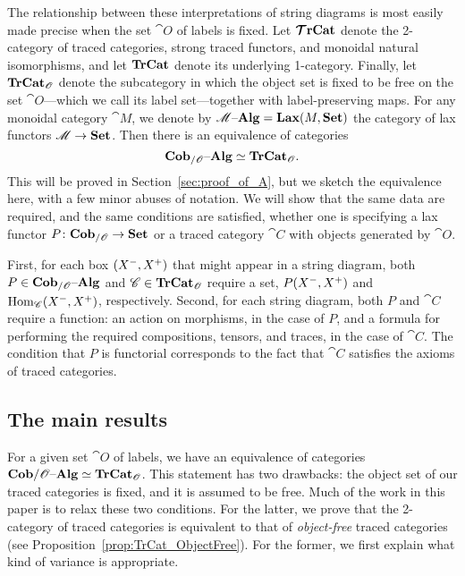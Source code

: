 \documentclass[12pt,oneside,article,draft]{memoir}
\begin{document}
The relationship between these interpretations of string diagrams is most easily made precise when
the set $\cat{O}$ of labels is fixed. Let $\bm{\mathcal{T}}\mathbf{rCat}$ denote the 2-category of traced categories,
strong traced functors, and monoidal natural isomorphisms, and let $\mathbf{TrCat}$ denote its underlying 1-category. Finally, let $\mathbf{TrCat}_{\mathscr{O}}$ denote the subcategory in which the object set is fixed to be free on the set $\cat{O}$---which we
call its label set---together with label-preserving maps. For any monoidal category
$\cat{M}$, we denote by $\mathscr{M}{\text \textendash}\mathbf{Alg}=\mathbf{Lax}(M,\mathbf{Set})$ the category of lax functors $\mathscr{M}\to\mathbf{Set}$. Then there
is an equivalence of categories
\begin{equation}\label{eq:single_fiber}
   \mathbf{Cob}_{/\mathscr{O}}{\text \textendash}\mathbf{Alg}\simeq\mathbf{TrCat}_{\mathscr{O}}.
\end{equation}
This will be proved in Section~\ref{sec:proof_of_A}, but we sketch the equivalence here, with a few
minor abuses of notation. We will show that the same data are required, and the same conditions are
satisfied, whether one is specifying a lax functor $P\colon\mathbf{Cob}_{/\mathscr{O}}\to\mathbf{Set}$ or a traced category
$\cat{C}$ with objects generated by $\cat{O}$.

First, for each box $(X^-,X^+)$ that might appear in a string diagram, both $P\in \mathbf{Cob}_{/\mathscr{O}}{\text \textendash}\mathbf{Alg}$ and
$\mathscr{C}\in\mathbf{TrCat}_{\mathscr{O}}$ require a set, $P(X^-,X^+)$ and $\operatorname{Hom}_{\mathscr{C}}(X^-,X^+)$, respectively.
Second, for each string diagram, both $P$ and $\cat{C}$ require a function: an action on morphisms,
in the case of $P$, and a formula for performing the required compositions, tensors, and traces, in
the case of $\cat{C}$.  The condition that $P$ is functorial corresponds to the fact that $\cat{C}$
satisfies the axioms of traced categories.

\subsection{The main results}\label{subsec:main_results}

For a given set $\cat{O}$ of labels, we have an equivalence of categories $\mathbf{Cob}/\mathscr{O}{\text \textendash}\mathbf{Alg}\simeq\mathbf{TrCat}_{\mathscr{O}}$. This statement has two drawbacks: the object set of our traced categories is fixed, and it is assumed to be free. Much of the work in this paper is to relax these two conditions. For the latter, we prove that the 2-category of traced categories is equivalent to that of \emph{object-free} traced categories (see Proposition~\ref{prop:TrCat_ObjectFree}). For the former, we first explain what kind of variance is appropriate.
\end{document}
